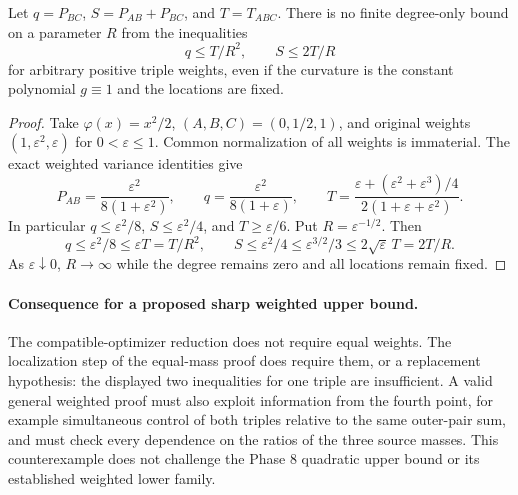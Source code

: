 \begin{proposition}
Let $q=P_{BC}$, $S=P_{AB}+P_{BC}$, and $T=T_{ABC}$. There is no finite
degree-only bound on a parameter $R$ from the inequalities
\[
 q\leq T/R^2,\qquad S\leq2T/R
\]
for arbitrary positive triple weights, even if the curvature is the
constant polynomial $g\equiv1$ and the locations are fixed.
\end{proposition}
\begin{proof}
Take $\varphi(x)=x^2/2$, $(A,B,C)=(0,1/2,1)$, and original weights
$(1,\varepsilon^2,\varepsilon)$ for $0<\varepsilon\leq1$.
Common normalization of all weights is immaterial. The exact weighted
variance identities give
\[
 P_{AB}=\frac{\varepsilon^2}{8(1+\varepsilon^2)},\qquad
 q=\frac{\varepsilon^2}{8(1+\varepsilon)},\qquad
 T=\frac{\varepsilon+(\varepsilon^2+\varepsilon^3)/4}
          {2(1+\varepsilon+\varepsilon^2)}.
\]
In particular $q\leq\varepsilon^2/8$, $S\leq\varepsilon^2/4$, and
$T\geq\varepsilon/6$. Put $R=\varepsilon^{-1/2}$. Then
\[
 q\leq\varepsilon^2/8\leq\varepsilon T=T/R^2,
 \qquad
 S\leq\varepsilon^2/4\leq\varepsilon^{3/2}/3
    \leq2\sqrt\varepsilon\,T=2T/R.
\]
As $\varepsilon\downarrow0$, $R\to\infty$ while the degree remains
zero and all locations remain fixed.
\end{proof}

\paragraph{Consequence for a proposed sharp weighted upper bound.}
The compatible-optimizer reduction does not require equal weights.
The localization step of the equal-mass proof does require them, or a
replacement hypothesis: the displayed two inequalities for one triple
are insufficient. A valid general weighted proof must also exploit
information from the fourth point, for example simultaneous control of
both triples relative to the same outer-pair sum, and must check every
dependence on the ratios of the three source masses. This counterexample
does not challenge the Phase 8 quadratic upper bound or its established
weighted lower family.
